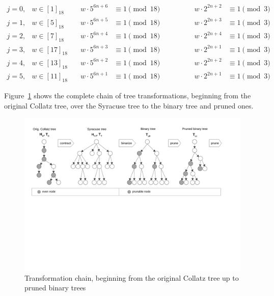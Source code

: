 \begin{equation}
\label{eq:homomorphism_congruences}
\begin{array}{llllll}
	j=0, & w\in [1]_{18} & \hspace{1em} w\cdot5^{6n+6}&\equiv1\pmod{18}&\hspace{4em}w\cdot2^{2n+2} &\equiv1\pmod{3}\\
	j=1, & w\in [5]_{18} & \hspace{1em} w\cdot5^{6n+5}&\equiv1\pmod{18}&\hspace{4em}w\cdot2^{2n+3} &\equiv1\pmod{3}\\
	j=2, & w\in [7]_{18} & \hspace{1em} w\cdot5^{6n+4}&\equiv1\pmod{18}&\hspace{4em}w\cdot2^{2n+4} &\equiv1\pmod{3}\\
	j=3, & w\in [17]_{18} & \hspace{1em} w\cdot5^{6n+3}&\equiv1\pmod{18}&\hspace{4em}w\cdot2^{2n+1} &\equiv1\pmod{3}\\
	j=4, & w\in [13]_{18} & \hspace{1em} w\cdot5^{6n+2}&\equiv1\pmod{18}&\hspace{4em}w\cdot2^{2n+2} &\equiv1\pmod{3}\\
	j=5, & w\in [11]_{18} & \hspace{1em} w\cdot5^{6n+1}&\equiv1\pmod{18}&\hspace{4em}w\cdot2^{2n+1} &\equiv1\pmod{3}
\end{array}
\end{equation}

Figure~\ref{fig:tree_transformations} shows the complete chain of tree transformations, beginning from the original Collatz tree, over the Syracuse tree to the binary tree and pruned ones.

\begin{figure}[H]
	\includegraphics[trim=1.1cm 10cm 2.6cm 0.2cm, 
	width=1.00\textwidth,page=1]{figures/tree_transformations.pdf}
	\caption{Transformation chain, beginning from the original Collatz tree up to pruned binary trees}
	\label{fig:tree_transformations}
\end{figure}